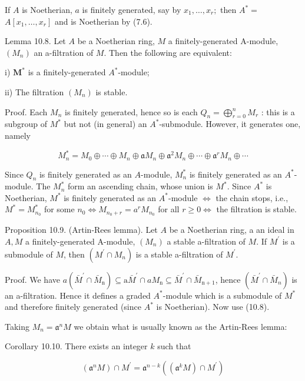 \documentclass{standalone}
\theoremstyle{definition}
\theoremstyle{remark}
\begin{document}
If $A$ is Noetherian, $a$ is finitely generated, say by $x_{1}, \ldots, x_{r} ;$ then $A^{*}=$ $A\left[x_{1}, \ldots, x_{r}\right]$ and is Noetherian by (7.6).

Lemma 10.8. Let $A$ be a Noetherian ring, $M$ a finitely-generated A-module, $\left(M_{n}\right)$ an a-filtration of $M$. Then the following are equivalent:

i) $\boldsymbol{M}^{*}$ is a finitely-generated $A^{*}$-module;

ii) The filtration $\left(M_{n}\right)$ is stable.

Proof. Each $M_{n}$ is finitely generated, hence so is each $Q_{n}=\bigoplus_{r=0}^{n} M_{r}$ : this is a subgroup of $M^{*}$ but not (in general) an $A^{*}$-submodule. However, it generates one, namely

\[
M_{n}^{*}=M_{0} \oplus \cdots \oplus M_{n} \oplus \mathfrak{a} M_{n} \oplus \mathfrak{a}^{2} M_{n} \oplus \cdots \oplus \mathfrak{a}^{r} M_{n} \oplus \cdots
\]

Since $Q_{n}$ is finitely generated as an $A$-module, $M_{n}^{*}$ is finitely generated as an $A^{*}$-module. The $M_{n}^{*}$ form an ascending chain, whose union is $M^{*}$. Since $A^{*}$ is Noetherian, $M^{*}$ is finitely generated as an $A^{*}$-module $\Leftrightarrow$ the chain stops, i.e., $M^{*}=M_{n_{0}}^{*}$ for some $n_{0} \Leftrightarrow M_{n_{0}+r}=a^{r} M_{n_{0}}$ for all $r \geqslant 0 \Leftrightarrow$ the filtration is stable.

Proposition 10.9. (Artin-Rees lemma). Let $A$ be a Noetherian ring, a an ideal in $A, M$ a finitely-generated A-module, $\left(M_{n}\right)$ a stable a-filtration of $M$. If $M^{\prime}$ is a submodule of $M$, then $\left(M^{\prime} \cap M_{n}\right)$ is a stable a-filtration of $M^{\prime}$.

Proof. We have $a\left(\bar{M}^{\prime} \cap \bar{M}_{\mathrm{n}}\right) \subseteq \mathrm{a} \bar{M}^{\prime} \cap a M_{\mathrm{n}} \subseteq \bar{M}^{\prime} \cap \bar{M}_{\mathrm{n}+1}$, hence $\left(\bar{M}^{\prime} \cap \bar{M}_{n}\right)$ is an a-filtration. Hence it defines a graded $A^{*}$-module which is a submodule of $M^{*}$ and therefore finitely generated (since $A^{*}$ is Noetherian). Now use (10.8).

Taking $M_{n}=\mathfrak{a}^{n} M$ we obtain what is usually known as the Artin-Rees lemma:

Corollary 10.10. There exists an integer $k$ such that

\[
\left(\mathfrak{a}^{n} M\right) \cap M^{\prime}=\mathfrak{a}^{n-k}\left(\left(\mathfrak{a}^{k} M\right) \cap M^{\prime}\right)
\]
\end{document}
